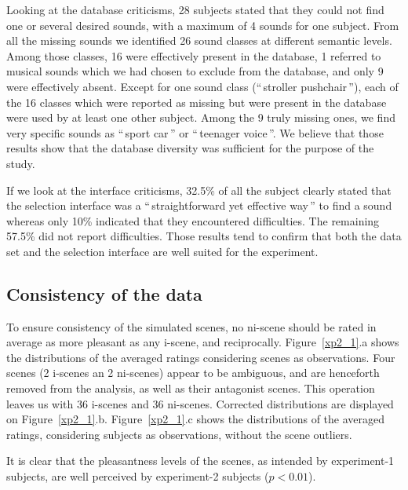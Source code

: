 \documentclass[twoside,twocolumn]{article}
\begin{document}
Looking at the database criticisms, 28 subjects stated that they could not find one or several desired sounds, with a maximum of 4 sounds for one subject. From all the missing sounds we identified 26 sound classes at different semantic levels. Among those classes, 16 were effectively present in the database, 1 referred to musical sounds which we had chosen to exclude from the database, and only 9 were effectively absent. Except for one sound class (``\,stroller pushchair\,''), each of the 16 classes which were reported as missing but were present in the database were used by at least one other subject. Among the 9 truly missing ones, we find very specific sounds as ``\,sport car\,'' or ``\,teenager voice\,''. We believe that those results show that the database diversity was sufficient for the purpose of the study. 

If we look at the interface criticisms, 32.5\% of all the subject clearly stated that the selection interface was a ``\,straightforward yet effective way\,'' to find a sound whereas only 10\% indicated that they encountered difficulties. The remaining 57.5\% did not report difficulties. Those results tend to confirm that both the data set and the selection interface are well suited for the experiment.

\subsection{Consistency of the data}

To ensure consistency of the simulated scenes, no ni-scene should be rated in average as more pleasant as any i-scene, and reciprocally. Figure~\ref{xp2_1}.a shows the distributions of the averaged ratings considering scenes as observations. Four scenes (2 i-scenes an 2 ni-scenes) appear to be ambiguous, and are henceforth removed from the analysis, as well as their antagonist scenes. This operation leaves us with 36 i-scenes and 36 ni-scenes. Corrected distributions are displayed on Figure~\ref{xp2_1}.b. Figure~\ref{xp2_1}.c shows the distributions of the averaged ratings, considering subjects as observations, without the scene outliers. 

It is clear that the pleasantness levels of the scenes, as intended by experiment-1 subjects, are well perceived by experiment-2 subjects ($p<0.01$).
\end{document}
